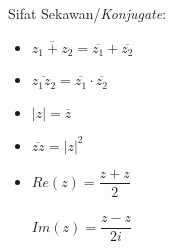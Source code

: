 \documentclass{article}
\begin{document}
    Sifat Sekawan/\textit{Konjugate}:
    \begin{itemize}
        \item $\overline{z_1 + z_2} = \overline{z_1} + \overline{z_2}$
        \item $\overline{z_1 z_2} = \overline{z_1} \cdot \overline{z_2}$
        \item $|z| = \overline{z}$
        \item $\overline{zz} = |z|^2$
        \item $Re(z) = \dfrac{z+z}{2}$\\ \\
            $Im(z) = \dfrac{z-z}{2i}$
    \end{itemize}

    
\end{document}
